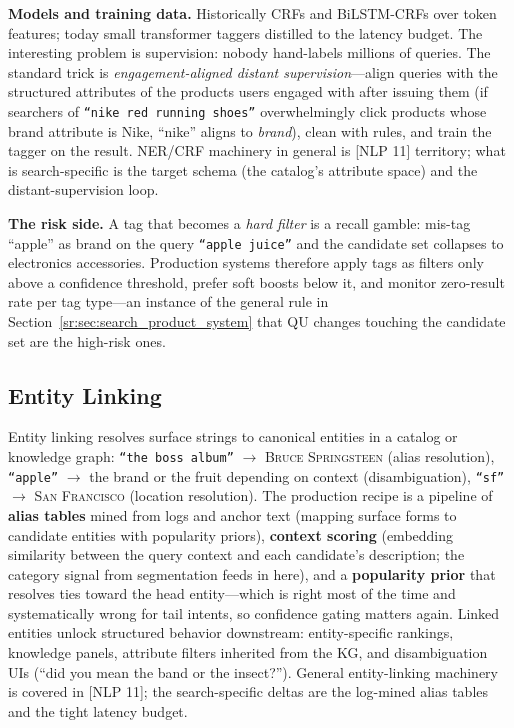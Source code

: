 \textbf{Models and training data.} Historically CRFs and BiLSTM-CRFs over token features; today small transformer taggers distilled to the latency budget. The interesting problem is supervision: nobody hand-labels millions of queries. The standard trick is \textit{engagement-aligned distant supervision}---align queries with the structured attributes of the products users engaged with after issuing them (if searchers of \texttt{``nike red running shoes''} overwhelmingly click products whose brand attribute is Nike, ``nike'' aligns to \textit{brand}), clean with rules, and train the tagger on the result. NER/CRF machinery in general is [NLP 11] territory; what is search-specific is the target schema (the catalog's attribute space) and the distant-supervision loop.

\textbf{The risk side.} A tag that becomes a \textit{hard filter} is a recall gamble: mis-tag ``apple'' as brand on the query \texttt{``apple juice''} and the candidate set collapses to electronics accessories. Production systems therefore apply tags as filters only above a confidence threshold, prefer soft boosts below it, and monitor zero-result rate per tag type---an instance of the general rule in Section~\ref{sr:sec:search_product_system} that QU changes touching the candidate set are the high-risk ones.

\subsection{Entity Linking}
\label{sr:sec:entity_linking}

Entity linking resolves surface strings to canonical entities in a catalog or knowledge graph: \texttt{``the boss album''} $\to$ \textsc{Bruce Springsteen} (alias resolution), \texttt{``apple''} $\to$ the brand or the fruit depending on context (disambiguation), \texttt{``sf''} $\to$ \textsc{San Francisco} (location resolution). The production recipe is a pipeline of \textbf{alias tables} mined from logs and anchor text (mapping surface forms to candidate entities with popularity priors), \textbf{context scoring} (embedding similarity between the query context and each candidate's description; the category signal from segmentation feeds in here), and a \textbf{popularity prior} that resolves ties toward the head entity---which is right most of the time and systematically wrong for tail intents, so confidence gating matters again. Linked entities unlock structured behavior downstream: entity-specific rankings, knowledge panels, attribute filters inherited from the KG, and disambiguation UIs (``did you mean the band or the insect?''). General entity-linking machinery is covered in [NLP 11]; the search-specific deltas are the log-mined alias tables and the tight latency budget.

